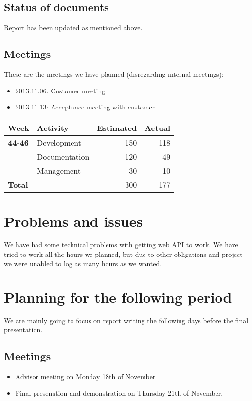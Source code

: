 \documentclass[12pt, a4paper]{article}
\begin{document}
\subsection{Status of documents}
Report has been updated as mentioned above. 
\subsection{Meetings}
These are the meetings we have planned (disregarding internal meetings):\\
\begin{itemize}
\item 2013.11.06: Customer meeting
\item 2013.11.13: Acceptance meeting with customer
\end{itemize}
  \begin{tabular}{| l | l | r | r |}
    \hline
    \textbf{Week} & \textbf{Activity} & \textbf{Estimated} & \textbf{Actual}\\ \hline
    \textbf{44-46} & Development & 150 & 118 \\ \hline
     & Documentation & 120 & 49 \\ \hline
     & Management & 30 & 10 \\ \hline
     \textbf{Total }&  & 300 & 177 \\
    \hline
  \end{tabular}

\section{Problems and issues}
We have had some technical problems with getting web API to work. We have tried to work all the hours we planned, but due to other obligations and project we were unabled to log as many hours as we wanted. 

\section{Planning for the following period}
We are mainly going to focus on report writing the following days before the final presentation. 
\subsection{Meetings}
\begin{itemize}
\item Advisor meeting on Monday 18th of November
\item Final presenation and demonstration on Thursday 21th of November. 
\end{itemize}
\newpage
\end{document}
